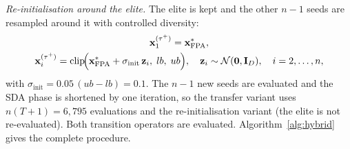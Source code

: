 \documentclass[preprint,12pt]{elsarticle}
\newcommand{\clip}{\operatorname{clip}}
\begin{document}
\emph{Re-initialisation around the elite.} The elite is kept and the other $n-1$ seeds are resampled around it with controlled diversity:
\begin{equation}
\begin{gathered}
\mathbf{x}_1^{(\tau^{+})}=\mathbf{x}^{*}_{\mathrm{FPA}},\\
\mathbf{x}_i^{(\tau^{+})}=\clip\!\Bigl(\mathbf{x}^{*}_{\mathrm{FPA}}+\sigma_{\mathrm{init}}\,\mathbf{z}_i,\;lb,\;ub\Bigr),\quad \mathbf{z}_i\sim\mathcal{N}(\mathbf{0},\mathbf{I}_D),\quad i=2,\dots,n,
\end{gathered}
\label{eq:reinit}
\end{equation}
with $\sigma_{\mathrm{init}}=0.05\,(ub-lb)=0.1$. The $n-1$ new seeds are evaluated and the SDA phase is shortened by one iteration, so the transfer variant uses $n(T+1)=6{,}795$ evaluations and the re-initialisation variant \EvalsReinit{} (the elite is not re-evaluated). Both transition operators are evaluated. Algorithm~\ref{alg:hybrid} gives the complete procedure.
\end{document}
